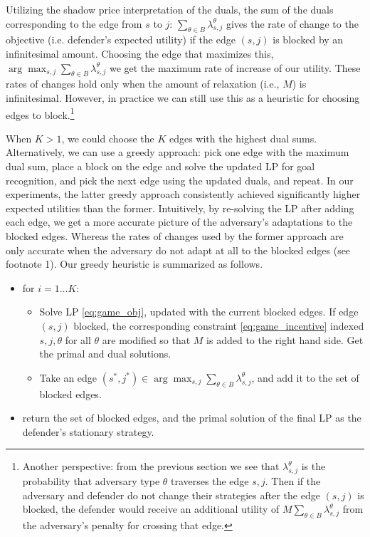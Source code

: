 Utilizing the shadow price interpretation of the duals, the sum of the duals corresponding to the 
edge from $s$ to $j$: 
$\sum_{\theta\in B} \lambda^\theta_{s,j}$
 gives the rate of change to the objective (i.e. defender's expected utility) if the edge $(s,j)$ is blocked by an infinitesimal amount.
 Choosing the edge that maximizes this,
 $\arg \max_{s,j}\sum_{\theta\in B} \lambda^\theta_{s,j}$
 we get the maximum rate of increase of our utility.
 These rates of changes hold only when the amount of relaxation (i.e., $M$) is infinitesimal. However,
 in practice we can still use this as a heuristic for choosing edges to block.\footnote{Another perspective: from the previous section we see that $\lambda^\theta_{s,j}$ is the probability that adversary type $\theta$ traverses the edge $s,j$. 
 Then if the adversary and defender do not change their strategies after the edge $(s,j)$ is blocked, the defender would receive an additional utility of 
 $M\sum_{\theta\in B} \lambda^\theta_{s,j}$ from the adversary's penalty for crossing that edge.}

When $K > 1$, we could choose the $K$ edges with the highest dual sums.
 Alternatively, we can use a greedy approach:
pick one edge  with the maximum dual sum, 
place a block on the edge and solve the updated LP for goal recognition, and pick the next edge using the updated duals, and repeat.
In our experiments, the latter greedy approach consistently achieved significantly higher expected utilities than the former.
Intuitively, by re-solving the LP after adding each edge,
we get a more accurate picture of the adversary's 
adaptations to the blocked edges.
Whereas the rates of changes used by the former approach are only accurate when the adversary do not adapt at all to the blocked edges (see footnote 1).
Our greedy heuristic is summarized as follows.
\begin{itemize} 

\item for $i=1 \ldots K$:
\begin{itemize}
\item Solve LP \eqref{eq:game_obj}, updated with the current blocked edges. If edge $(s,j)$ blocked, the corresponding constraint \eqref{eq:game_incentive} indexed $s,j,\theta$ for all $\theta$ are modified so that $M$ is added to the right hand side.
Get the primal and dual solutions.
\item Take an edge $(s^*,j^*) \in\arg \max_{s,j}\sum_{\theta\in B} \lambda^\theta_{s,j}$,
and add it to the set of blocked edges.


\end{itemize}
\item return the set of blocked edges, and the primal solution of the final LP as the defender's stationary strategy. 
\end{itemize}


